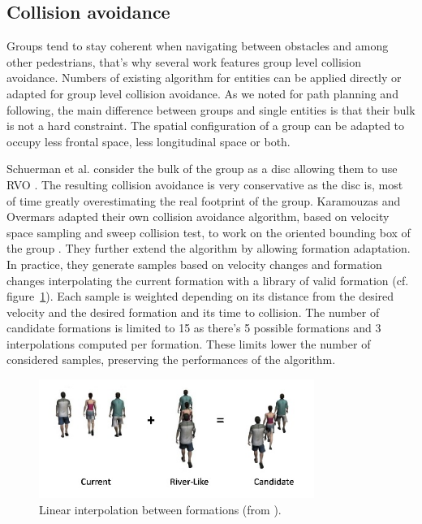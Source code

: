\documentclass{article}
\begin{document}
\subsection{Collision avoidance}

Groups tend to stay coherent when navigating between obstacles and among other pedestrians, that’s why several work features group level collision avoidance. Numbers of existing algorithm for entities can be applied directly or adapted for group level collision avoidance. As we noted for path planning and following, the main difference between groups and single entities is that their bulk is not a hard constraint. The spatial configuration of a group can be adapted to occupy less frontal space, less longitudinal space or both. 

Schuerman et al. consider the bulk of the group as a disc allowing them to use RVO \cite{Schuerman:2010um,vandenBerg:2008tu}. The resulting collision avoidance is very conservative as the disc is, most of time greatly overestimating the real footprint of the group. Karamouzas and Overmars adapted their own collision avoidance algorithm, based on velocity space sampling and sweep collision test, to work on the oriented bounding box of the group \cite{ko_vriphys10,Karamouzas:2010fi}. They further extend the algorithm by allowing formation adaptation. In practice, they generate samples based on velocity changes and formation changes interpolating the current formation with a library of valid formation (cf. figure~\ref{fig:formations_linear_interpolation}). Each sample is weighted depending on its distance from the desired velocity and the desired formation and its time to collision. The number of candidate formations is limited to 15 as there’s 5 possible formations and 3 interpolations computed per formation. These limits lower the number of considered samples, preserving the performances of the algorithm. 

\begin{figure}[htb]
\centering
\includegraphics[width=0.8\textwidth]{FormationsLinearInterpolation.jpg}
\caption{Linear interpolation between formations (from \cite{Karamouzas:2010fi}).}
\label{fig:formations_linear_interpolation}
\end{figure} 
\end{document}

